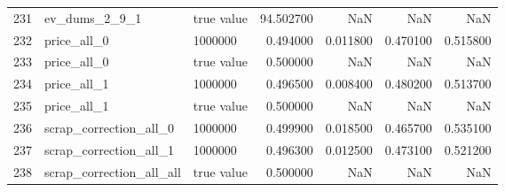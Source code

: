 \begin{tabular}{lllrrrr}
231 & ev_dums_2_9_1 & true value & 94.502700 & NaN & NaN & NaN \\
232 & price_all_0 & 1000000 & 0.494000 & 0.011800 & 0.470100 & 0.515800 \\
233 & price_all_0 & true value & 0.500000 & NaN & NaN & NaN \\
234 & price_all_1 & 1000000 & 0.496500 & 0.008400 & 0.480200 & 0.513700 \\
235 & price_all_1 & true value & 0.500000 & NaN & NaN & NaN \\
236 & scrap_correction_all_0 & 1000000 & 0.499900 & 0.018500 & 0.465700 & 0.535100 \\
237 & scrap_correction_all_1 & 1000000 & 0.496300 & 0.012500 & 0.473100 & 0.521200 \\
238 & scrap_correction_all_all & true value & 0.500000 & NaN & NaN & NaN \\
\bottomrule
\end{tabular}
